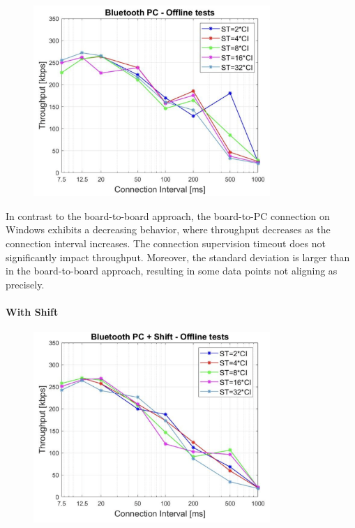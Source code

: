 \documentclass{Configuration_Files/PoliMi3i_thesis}
\begin{document}
\begin{figure}[H]
    \centering
    \includegraphics[width=0.8\textwidth]{Results Manuel/figure33}
    \label{fig:figure1}
\end{figure}

In contrast to the board-to-board approach, the board-to-PC connection on Windows exhibits a decreasing behavior, where throughput decreases as the connection interval increases. The connection supervision timeout does not significantly impact throughput. Moreover, the standard deviation is larger than in the board-to-board approach, resulting in some data points not aligning as precisely.

\paragraph{With Shift}

\begin{figure}[H]
    \centering
    \includegraphics[width=0.8\textwidth]{Results Manuel/figure34}
    \label{fig:figure1}
\end{figure}
\end{document}
